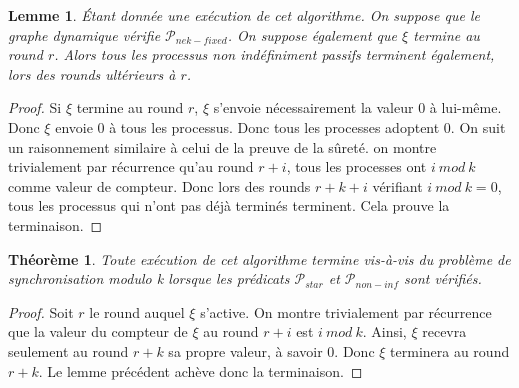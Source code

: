 \documentclass{article}
\newtheorem{lemma}{Lemme}
\newtheorem{theorem}{Théorème}
\begin{document}
\begin{lemma}
	Étant donnée une exécution de cet algorithme. On suppose que le graphe dynamique vérifie $\mathcal{P}_{nek-fixed}$.
	On suppose également que $\xi$ termine au round $r$.
	Alors tous les processus non indéfiniment passifs terminent également, lors des rounds ultérieurs à $r$.
\end{lemma}
\begin{proof}
	Si $\xi$ termine au round $r$, $\xi$ s'envoie nécessairement la valeur $0$ à lui-même. Donc $\xi$ envoie $0$ à tous les processus. 
	Donc tous les processes adoptent $0$.
	On suit un raisonnement similaire à celui de la preuve de la sûreté.
	on montre trivialement par récurrence qu'au round $r+i$, tous les processes ont $i~mod~k$ comme valeur de compteur.
	Donc lors des rounds $r+k+i$ vérifiant $i~mod~k = 0$, tous les processus qui n'ont pas déjà terminés terminent.
	Cela prouve la terminaison.
\end{proof}
\begin{theorem}
	Toute exécution de cet algorithme termine vis-à-vis du problème de synchronisation modulo k lorsque les prédicats $\mathcal{P}_{star}$ et $\mathcal{P}_{non-inf}$ sont vérifiés.
\end{theorem}
\begin{proof}
	Soit $r$ le round auquel $\xi$ s'active.
	On montre trivialement par récurrence que la valeur du compteur de $\xi$ au round $r+i$ est $i~mod~k$.
	Ainsi, $\xi$ recevra seulement au round $r+k$ sa propre valeur, à savoir $0$. Donc $\xi$ terminera au round $r+k$. Le lemme précédent achève donc la terminaison.
\end{proof}
\end{document}
